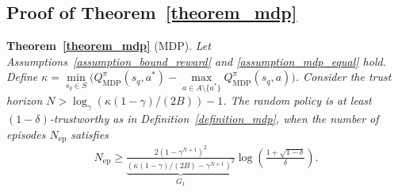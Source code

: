 \clearpage

\subsection{Proof of Theorem~\ref{theorem_mdp}}
\label{appendix_omit_proof_theorem_mdp}


\textbf{Theorem~\ref{theorem_mdp}} (MDP). 
\textit{
Let Assumptions~\ref{assumption_bound_reward} and \ref{assumption_mdp_equal} hold.
 Define $\kappa = \min\limits_{s_q \in S} \big( Q_\text{MDP}^\pi(s_q, a^*) - \max\limits_{a \in A \setminus \{a^*\}} Q_\text{MDP}^\pi(s_q, a) \big)$. Consider the trust horizon $N > \log_\gamma \left( \kappa (1-\gamma)/(2B) \right)-1$. The random policy is at least $(1-\delta)$-trustworthy as in Definition~\ref{definition_mdp}, when the number of episodes $N_\text{ep}$ satisfies
%
\begin{align}
    N_\text{ep}  \geq \underbrace{ \frac{ 2 \left( 1-\gamma^{N+1}\right)^2}{ \left( \kappa \left( 1-\gamma \right) / (2B) - \gamma^{N+1}\right)^2} }_{G_1}   \log \left( \frac{1+\sqrt{1-\delta}}{\delta} \right).
\end{align}
%
}
%
%
%
%
%
